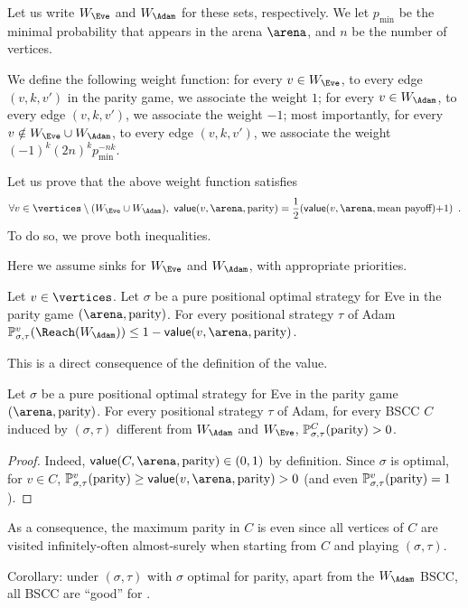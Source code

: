 Let us write $W_\Eve$ and $W_\Adam$ for these sets, respectively. We let
$p_{\min}$ be the minimal probability that appears in the arena
$\arena$, and $n$ be the number of vertices.

We define the following weight function: for every $v \in W_\Eve$,
to every edge $(v,k,v')$ in the parity game, we associate the weight
$1$; for every $v \in W_\Adam$, to every edge $(v,k,v')$, we associate
the weight $-1$; most importantly, for every
$v \notin W_\Eve \cup W_\Adam$, to every edge $(v,k,v')$, we associate the
weight $(-1)^k (2n)^k p_{\min}^{-nk}$.

Let us prove that the above weight function satisfies
\[
\forall v \in \vertices \setminus (W_\Eve \cup W_\Adam),\ 
\mathsf{value}(v,\arena,\textrm{parity}) = \frac 1 2
(\mathsf{value}(v,\arena,\textrm{mean payoff}) {+} 1)\enspace.
\]
To do so, we prove both inequalities.

Here we assume sinks for $W_\Eve$ and $W_\Adam$, with appropriate priorities.

\begin{lemma} Let $v \in \vertices$. Let $\sigma$ be a pure
positional optimal strategy for Eve in the parity game
$(\arena,\textrm{parity})$. For every positional strategy $\tau$
of Adam
$\probm_{\sigma,\tau}^v(\Reach(W_\Adam)) \leq 1 -
\mathsf{value}(v,\arena,\textrm{parity})$.
\end{lemma}
This is a direct consequence of the definition of the value.

\begin{lemma}
  Let $\sigma$ be a pure positional optimal strategy for Eve in
  the parity game $(\arena,\textrm{parity})$. For every positional
  strategy $\tau$ of Adam, for every BSCC $C$ induced by
  $(\sigma,\tau)$ different from $W_\Adam$ and $W_\Eve$,
  $\mathbb{P}_{\sigma,\tau}^C(\textrm{parity}) >0$.
\end{lemma}
\begin{proof}
  Indeed, $\mathsf{value}(C,\arena,\textrm{parity}) \in (0,1)$ by
  definition. Since $\sigma$ is optimal, for $v \in C$,
  $\probm_{\sigma,\tau}^v(\textrm{parity}) \geq
  \mathsf{value}(v,\arena,\textrm{parity}) >0$ (and even
  $\mathbb{P}_{\sigma,\tau}^v(\textrm{parity})=1$).
\end{proof}
As a consequence, the maximum parity in $C$ is even since all
vertices of $C$ are visited infinitely-often almost-surely when
starting from $C$ and playing $(\sigma,\tau)$.

Corollary: under $(\sigma,\tau)$ with $\sigma$ optimal for parity,
apart from the $W_\Adam$ BSCC, all BSCC are ``good'' for \Eve.

